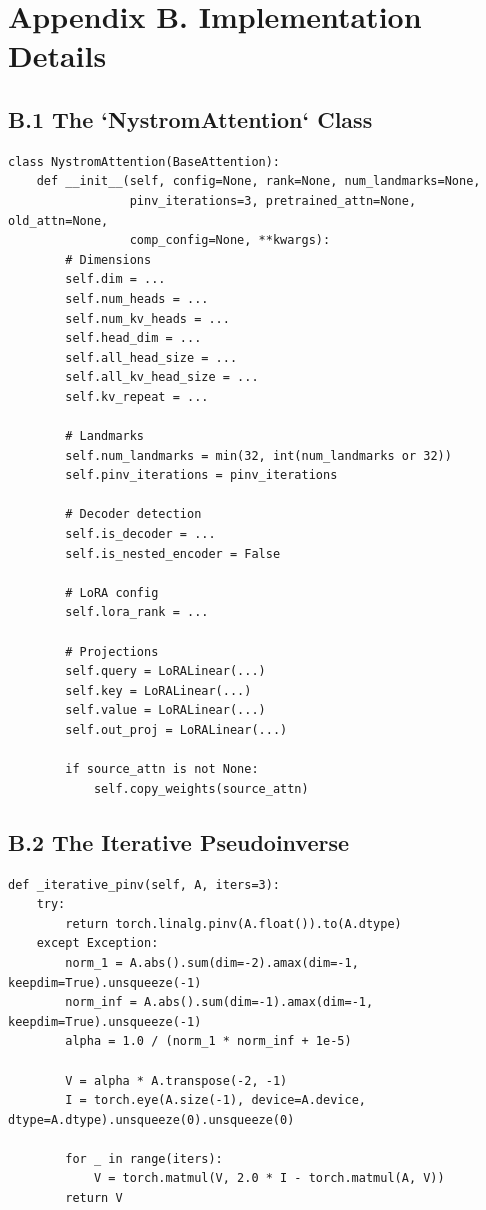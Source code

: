 
\section{Appendix B. Implementation Details}

\subsection{B.1 The `NystromAttention` Class}

\begin{lstlisting}
class NystromAttention(BaseAttention):
    def __init__(self, config=None, rank=None, num_landmarks=None,
                 pinv_iterations=3, pretrained_attn=None, old_attn=None,
                 comp_config=None, **kwargs):
        # Dimensions
        self.dim = ...
        self.num_heads = ...
        self.num_kv_heads = ...
        self.head_dim = ...
        self.all_head_size = ...
        self.all_kv_head_size = ...
        self.kv_repeat = ...
        
        # Landmarks
        self.num_landmarks = min(32, int(num_landmarks or 32))
        self.pinv_iterations = pinv_iterations
        
        # Decoder detection
        self.is_decoder = ...
        self.is_nested_encoder = False
        
        # LoRA config
        self.lora_rank = ...
        
        # Projections
        self.query = LoRALinear(...)
        self.key = LoRALinear(...)
        self.value = LoRALinear(...)
        self.out_proj = LoRALinear(...)
        
        if source_attn is not None:
            self.copy_weights(source_attn)
\end{lstlisting}

\subsection{B.2 The Iterative Pseudoinverse}

\begin{lstlisting}
def _iterative_pinv(self, A, iters=3):
    try:
        return torch.linalg.pinv(A.float()).to(A.dtype)
    except Exception:
        norm_1 = A.abs().sum(dim=-2).amax(dim=-1, keepdim=True).unsqueeze(-1)
        norm_inf = A.abs().sum(dim=-1).amax(dim=-1, keepdim=True).unsqueeze(-1)
        alpha = 1.0 / (norm_1 * norm_inf + 1e-5)
        
        V = alpha * A.transpose(-2, -1)
        I = torch.eye(A.size(-1), device=A.device, dtype=A.dtype).unsqueeze(0).unsqueeze(0)
        
        for _ in range(iters):
            V = torch.matmul(V, 2.0 * I - torch.matmul(A, V))
        return V
\end{lstlisting}

